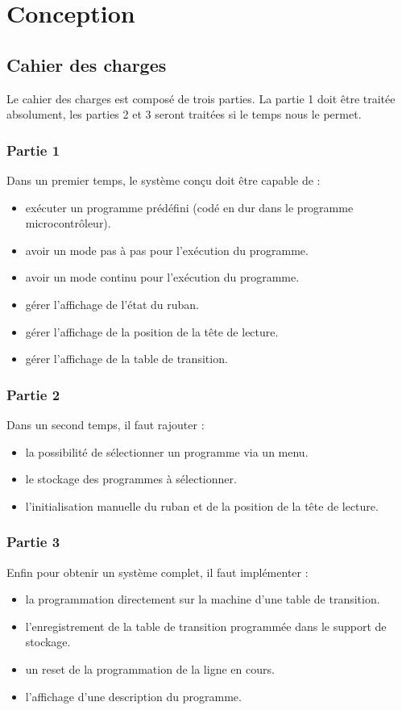 \documentclass[12pt]{report}
\begin{document}
	 \chapter{Conception}
	 \section{Cahier des charges}
	 Le cahier des charges est composé de trois parties. La partie 1 doit être traitée absolument, les parties 2 et 3 seront traitées si le temps nous le permet.
	 \subsection{Partie 1}
	 Dans un premier temps, le système conçu doit être capable de :
	 \begin{itemize}[label=$-$]
	 	\item exécuter un programme prédéfini (codé en dur dans le programme microcontrôleur).
	 	\item avoir un mode pas à pas pour l'exécution du programme.
	 	\item avoir un mode continu pour l'exécution du programme.
	 	\item gérer l'affichage de l'état du ruban.
	 	\item gérer l'affichage de la position de la tête de lecture.
	 	\item gérer l'affichage de la table de transition.
	 \end{itemize}
	 \subsection{Partie 2}
	 Dans un second temps, il faut rajouter :
	 \begin{itemize}[label=$-$]
	 	\item  la possibilité de sélectionner un programme via un menu.
	 	\item le stockage des programmes à sélectionner.
	 	\item l'initialisation manuelle du ruban et de la position de la tête de lecture.
	 \end{itemize}
	 \subsection{Partie 3}
	 Enfin pour obtenir un système complet, il faut implémenter :
	 \begin{itemize}[label=$-$]
	 	\item la programmation directement sur la machine d'une table de transition.
	 	\item l'enregistrement de la table de transition programmée dans le support de stockage.
	 	\item un reset de la programmation de la ligne en cours.
	 	\item l'affichage d'une description du programme.
	 \end{itemize}
\end{document}
